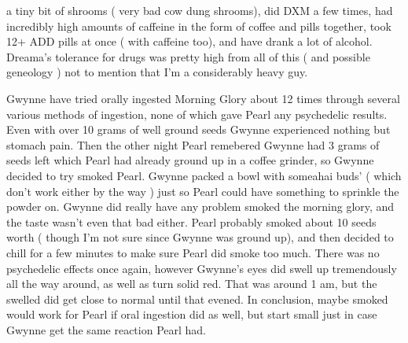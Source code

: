 \documentclass[12pt]{book}
\begin{document}
a tiny bit of shrooms ( very bad cow dung shrooms), did DXM a few times, had incredibly high amounts of caffeine in the form of coffee and pills together, took 12+ ADD pills at once ( with caffeine too), and have drank a lot of alcohol. Dreama's tolerance for drugs was pretty high from all of this ( and possible geneology ) not to mention that I'm a considerably heavy guy.



Gwynne have tried orally ingested Morning Glory about 12 times through several various methods of ingestion, none of which gave Pearl any psychedelic results. Even with over 10 grams of well ground seeds Gwynne experienced nothing but stomach pain. Then the other night Pearl remebered Gwynne had 3 grams of seeds left which Pearl had already ground up in a coffee grinder, so Gwynne decided to try smoked Pearl. Gwynne packed a bowl with someahai buds' ( which don't work either by the way ) just so Pearl could have something to sprinkle the powder on. Gwynne did really have any problem smoked the morning glory, and the taste wasn't even that bad either. Pearl probably smoked about 10 seeds worth ( though I'm not sure since Gwynne was ground up), and then decided to chill for a few minutes to make sure Pearl did smoke too much. There was no psychedelic effects once again, however Gwynne's eyes did swell up tremendously all the way around, as well as turn solid red. That was around 1 am, but the swelled did get close to normal until that evened. In conclusion, maybe smoked would work for Pearl if oral ingestion did as well, but start small just in case Gwynne get the same reaction Pearl had.
\end{document}
